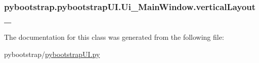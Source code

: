 \hypertarget{classpybootstrap_1_1pybootstrapUI_1_1Ui__MainWindow_a0ea5f6d2a7ba5a949f98ac31f6bf829f}{
\subsubsection[{vertical\-Layout\-\_\-6}]{\setlength{\rightskip}{0pt plus 5cm}pybootstrap.\-pybootstrap\-U\-I.\-Ui\-\_\-\-Main\-Window.\-vertical\-Layout\-\_}}\label{classpybootstrap_1_1pybootstrapUI_1_1Ui__MainWindow_a0ea5f6d2a7ba5a949f98ac31f6bf829f}


The documentation for this class was generated from the following file\-:\begin{DoxyCompactItemize}
\item 
pybootstrap/\hyperlink{pybootstrapUI_8py}{pybootstrap\-U\-I.\-py}\end{DoxyCompactItemize}

